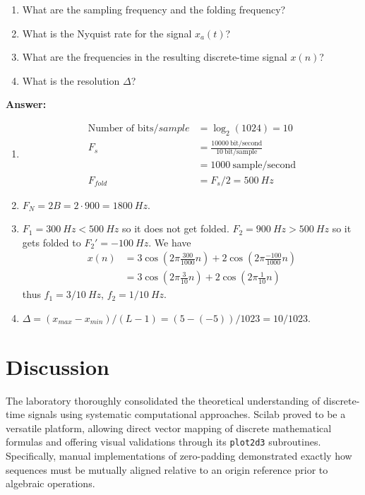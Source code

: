 \documentclass[12pt,a4paper]{article}
\begin{document}
\begin{enumerate}[label=\textbf{(\alph*)}, leftmargin=*]
    \item What are the sampling frequency and the folding frequency?
    \item What is the Nyquist rate for the signal $x_a(t)$?
    \item What are the frequencies in the resulting discrete-time signal $x(n)$?
    \item What is the resolution $\Delta$?
\end{enumerate}

\noindent\textbf{Answer:}

\begin{enumerate}[label=\textbf{(\alph*)}, leftmargin=*]
    \item 
    \begin{align*}
        \text{Number of bits}/sample &= \log_2(1024) = 10\\
        F_s &= \frac{10000\: \text{bit/second}}{10 \:\text{bit/sample}}\\
        &= 1000\:\text{sample/second}\\
        F_{fold} &= F_s/2 = 500\: Hz   
    \end{align*}
    \item $F_N = 2B = 2\cdot 900 = 1800\: Hz$.
    \item $F_1 = 300\: Hz < 500\: Hz$ so it does not get folded. $F_2= 900\: Hz > 500\:Hz$ so it gets folded to $F_2' = -100\: Hz$.
    We have
    \begin{align*}
        x(n) &= 3\cos(2\pi\frac{300}{1000}n) + 2\cos(2\pi\frac{-100}{1000}n)\\
        &= 3\cos(2\pi\frac{3}{10}n) + 2\cos(2\pi\frac{1}{10}n)
    \end{align*}
    thus $f_1 = 3/10\: Hz$, $f_2=1/10\: Hz$.
    \item $\Delta = (x_{max}-x_{min})/(L-1)= (5-(-5))/1023 = 10/1023$.
\end{enumerate}

\section{Discussion}
The laboratory thoroughly consolidated the theoretical understanding of discrete-time signals using systematic computational approaches. Scilab proved to be a versatile platform, allowing direct vector mapping of discrete mathematical formulas and offering visual validations through its \texttt{plot2d3} subroutines. Specifically, manual implementations of zero-padding demonstrated exactly how sequences must be mutually aligned relative to an origin reference prior to algebraic operations.
\end{document}
